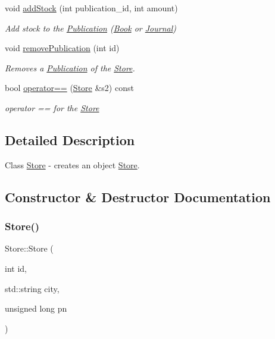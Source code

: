 \begin{DoxyCompactItemize}
$$void \hyperlink{class_store_a67bad0d70942ce8560926110297fdf33}{add\+Stock} (int publication\+\_\+id, int amount)
\begin{DoxyCompactList}\small\item\em Add stock to the \hyperlink{class_publication}{Publication} (\hyperlink{class_book}{Book} or \hyperlink{class_journal}{Journal}) \end{DoxyCompactList}\item 
void \hyperlink{class_store_a64f322bc111e0e88ab0995cd86718f0d}{remove\+Publication} (int id)
\begin{DoxyCompactList}\small\item\em Removes a \hyperlink{class_publication}{Publication} of the \hyperlink{class_store}{Store}. \end{DoxyCompactList}\item 
bool \hyperlink{class_store_a4dfd27a0615f161f2f0e94297bb54969}{operator==} (\hyperlink{class_store}{Store} \&s2) const
\begin{DoxyCompactList}\small\item\em operator == for the \hyperlink{class_store}{Store} \end{DoxyCompactList}\end{DoxyCompactItemize}


\subsection{Detailed Description}
Class \hyperlink{class_store}{Store} -\/ creates an object \hyperlink{class_store}{Store}. 

\subsection{Constructor \& Destructor Documentation}
\mbox{\label{class_store_a7e67d8e31c81dd0ae4a8fa5a397a40df}} 
\subsubsection{\texorpdfstring{Store()}{Store()}}
{\footnotesize\ttfamily Store\+::\+Store (\begin{DoxyParamCaption}\item[{int}]{id,  }\item[{std\+::string}]{city,  }\item[{unsigned long}]{pn }\end{DoxyParamCaption})}



